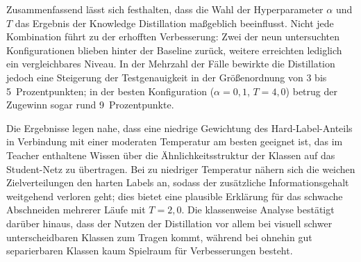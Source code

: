 Zusammenfassend lässt sich festhalten, dass die Wahl der Hyperparameter $\alpha$ und $T$ das Ergebnis der Knowledge
Distillation maßgeblich beeinflusst. Nicht jede Kombination führt zu der erhofften Verbesserung: Zwei der neun
untersuchten Konfigurationen blieben hinter der Baseline zurück, weitere erreichten lediglich ein vergleichbares Niveau.
In der Mehrzahl der Fälle bewirkte die Distillation jedoch eine Steigerung der Testgenauigkeit in der Größenordnung von
3 bis 5~Prozentpunkten; in der besten Konfiguration ($\alpha = 0{,}1$, $T = 4{,}0$) betrug der Zugewinn sogar
rund 9~Prozentpunkte.
 
Die Ergebnisse legen nahe, dass eine niedrige Gewichtung des Hard-Label-Anteils in Verbindung mit einer moderaten
Temperatur am besten geeignet ist, das im Teacher enthaltene Wissen über die Ähnlichkeitsstruktur der Klassen auf das
Student-Netz zu übertragen. Bei zu niedriger Temperatur nähern sich die weichen Zielverteilungen den harten Labels an,
sodass der zusätzliche Informationsgehalt weitgehend verloren geht; dies bietet eine plausible Erklärung für das schwache
Abschneiden mehrerer Läufe mit $T = 2{,}0$. Die klassenweise Analyse bestätigt darüber hinaus, dass der Nutzen der
Distillation vor allem bei visuell schwer unterscheidbaren Klassen zum Tragen kommt, während bei ohnehin gut separierbaren
Klassen kaum Spielraum für Verbesserungen besteht.
